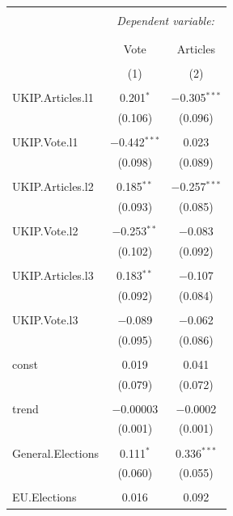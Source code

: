 \documentclass[12pt,article]{article}
\begin{document}
\begin{table}[!htbp] \centering 
  \caption{} 
  \label{} 
\begin{tabular}{@{\extracolsep{5pt}}lcc} 
\\[-1.8ex]\hline 
\hline \\[-1.8ex] 
 & \multicolumn{2}{c}{\textit{Dependent variable:}} \\ 
\cline{2-3} 
\\[-1.8ex] & \multicolumn{2}{c}{} \\ 
 & Vote & Articles \\ 
\\[-1.8ex] & (1) & (2)\\ 
\hline \\[-1.8ex] 
 UKIP.Articles.l1 & 0.201$^{*}$ & $-$0.305$^{***}$ \\ 
  & (0.106) & (0.096) \\ 
  & & \\ 
 UKIP.Vote.l1 & $-$0.442$^{***}$ & 0.023 \\ 
  & (0.098) & (0.089) \\ 
  & & \\ 
 UKIP.Articles.l2 & 0.185$^{**}$ & $-$0.257$^{***}$ \\ 
  & (0.093) & (0.085) \\ 
  & & \\ 
 UKIP.Vote.l2 & $-$0.253$^{**}$ & $-$0.083 \\ 
  & (0.102) & (0.092) \\ 
  & & \\ 
 UKIP.Articles.l3 & 0.183$^{**}$ & $-$0.107 \\ 
  & (0.092) & (0.084) \\ 
  & & \\ 
 UKIP.Vote.l3 & $-$0.089 & $-$0.062 \\ 
  & (0.095) & (0.086) \\ 
  & & \\ 
 const & 0.019 & 0.041 \\ 
  & (0.079) & (0.072) \\ 
  & & \\ 
 trend & $-$0.00003 & $-$0.0002 \\ 
  & (0.001) & (0.001) \\ 
  & & \\ 
 General.Elections & 0.111$^{*}$ & 0.336$^{***}$ \\ 
  & (0.060) & (0.055) \\ 
  & & \\ 
 EU.Elections & 0.016 & 0.092 \\ 

\end{tabular}
\end{table}
\end{document}
